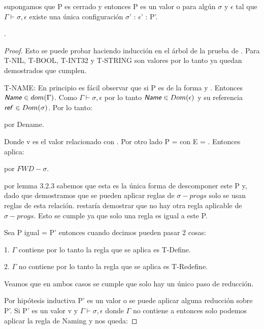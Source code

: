 \begin{theorem}[Progreso]
    supongamos que P es cerrado y 
    entonces P es un valor o para algún $\sigma$ y $\epsilon$ tal que
    $\Gamma \vdash \sigma, \epsilon$ existe una única configuración $\sigma$' : $\epsilon$' : P'.  

     \fullarrow {}.

\end{theorem}
\begin{proof}
Esto se puede probar haciendo inducción en el árbol de la prueba de  .
 Para T-NIL, T-BOOL, T-INT32 y T-STRING son valores por lo tanto ya quedan demostrados que cumplen.

T-NAME: En principio es fácil observar que si P es de la forma 
y . Entonces $\textsf{\textit{Name}} \in dom(\Gamma)$. Como $\Gamma 
\vdash \sigma, \epsilon$ por lo tanto  $\textsf{\textit{Name}} \in Dom(\epsilon)$ y su referencia $\textsf{\textit{ref}} \in Dom(\sigma)$. Por lo tanto:

 \sigmaprogarrow {} por Dename.

Donde v es el valor relacionado con . Por otro lado P =  con E = \hole.
 Entonces aplica:

 \fullarrow \sigmaprog{$\sigma$}{$\epsilon$}{[v]} por $FWD-\sigma$.

por lemma 3.2.3 sabemos que esta es la única forma de descomponer este P y, dado que demostramos que se pueden aplicar reglas de $\sigma-progs$ solo se usan reglas de esta relación.
restaría demostrar que no hay otra regla aplicable de $\sigma-progs$. Esto se cumple ya que solo una regla es igual a este P.

Sea P igual  = P' entonces cuando decimos 
 pueden pasar 2 cosas:

    1. $\Gamma$ contiene  por lo tanto la regla que se aplica es
    T-Define.

    2. $\Gamma$ no contiene  por lo tanto la regla que se aplica
    es T-Redefine.

Veamos que en ambos casos se cumple que solo hay un único paso de reducción.

Por hipótesis inductiva P' es un valor o se puede aplicar alguna 
reducción sobre P'. Si P' es un valor v y $\Gamma \vdash \sigma, \epsilon$
 donde $\Gamma$ no contiene a  entonces solo podemos aplicar 
 la regla de Naming y nos queda:


\end{proof}
